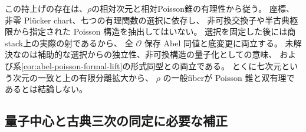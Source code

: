 \begin{remark}[構成の意味と未解決部分]
この持上げの存在は、$\rho$の相対次元と相対Poisson錐の有理性から従う。
座標、非零 Pl\"ucker chart、七つの有理関数の選択に依存し、
非可換交換子や半古典極限から指定された Poisson 構造を抽出してはいない。
選択を固定した後には商stack上の実際の射であるから、
全 $\mathcal O$ 保存 Abel 同値と底変更に両立する。
未解決なのは補助的な選択からの独立性、非可換構造の量子化としての意味、
および系\ref{cor:abel-poisson-formal-lift}の形式同型との両立である。
とくに七次元という次元の一致と上の有限分離拡大から、
$\rho$ の一般fiberが Poisson 錐と双有理であるとは結論しない。
\end{remark}

\subsection{量子中心と古典三次の同定に必要な補正}

